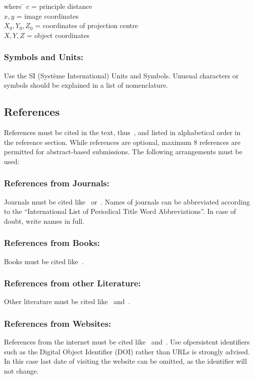 \documentclass{isprs} %
\begin{document}
\begin{tabbing} 
where \hspace{0.6cm} \= $c$ = principle distance\\
\> $x,y$ = image coordinates\\
\> $X_0,Y_0, Z_0$ = coordinates of projection centre\\
\> $X, Y, Z$ = object coordinates
\end{tabbing}

\subsubsection{Symbols and Units:}\label{sec:Symbols and Units}
Use the SI (Syst\`{e}me International) Units and Symbols. Unusual characters 
or symbols should be explained in a list of nomenclature.

\subsection{References}\label{sec:References}
References must be cited in the text, thus~\cite{smith1987rep}, and listed in alphabetical order in the reference section. While references are optional, maximum 8 references are permitted for abstract-based submissions. The following arrangements must be used:

\subsubsection{References from Journals:} 
Journals must be cited like~\cite{smith1987} or~\cite{michalis2008}. Names of journals can be abbreviated according to the ``International List of Periodical Title Word Abbreviations''. In case of doubt, write names in full.

\subsubsection{References from Books:} 
Books must be cited like~\cite{foerstner2016}.

\subsubsection{References from other Literature:}
Other literature must be cited like~\cite{smith1987rep} and~\cite{smith2000}.

\subsubsection{References from Websites:}
References from the internet must be cited like~\cite{chan2017} and~\cite{maas2017}. Use ofpersistent identifiers such as the Digital Object Identifier (DOI) rather than URLs is strongly advised. In this case last date of visiting the website can be omitted, as the identifier will not change.
\end{document}
